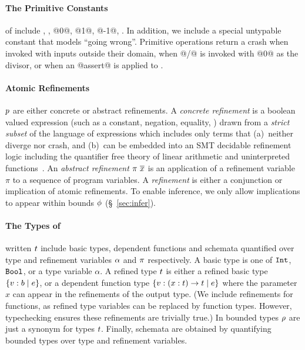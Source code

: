 \paragraph{The Primitive Constants} of \corelan include
\true, \false, @0@, @1@, @-1@, \etc. In addition, we include a
special untypable constant \ecrash that models ``going wrong''.
Primitive operations return a crash when invoked with inputs
outside their domain, \eg when @/@ is invoked with @0@ as the
divisor, or when an @assert@ is applied to \false.

\paragraph{Atomic Refinements} $p$ are either concrete or abstract refinements.
%
A \emph{concrete refinement} \creft is a boolean valued expression
(such as a constant, negation, equality, \etc)
drawn from a \emph{strict subset} of the language of expressions
which includes only terms that
%
(a)~neither diverge nor crash, and
%
(b)~can be embedded into an SMT decidable refinement logic including
%
the quantifier free theory of linear arithmetic and uninterpreted
functions~\cite{LiquidICFP14}.
%
An \emph{abstract refinement} ${\pi \ \overline{x}}$ is an application of
a refinement variable $\pi$ to a sequence of program variables.
%
A \emph{refinement}  is either a conjunction or
implication of atomic refinements.
%
To enable inference, we only allow implications to appear within
bounds $\phi$ (\S~\ref{sec:infer}).


\paragraph{The Types of} \corelan written $t$ include basic types,
dependent functions and schemata quantified over type and refinement
variables $\alpha$ and $\pi$ respectively.
%
A basic type is one of $\texttt{Int}$, $\texttt{Bool}$, or a type
variable $\alpha$.
%
A refined type $t$ is either a refined basic type $\left\lbrace v : b\mid e\right\rbrace$,
or a dependent function type $\left\lbrace v : {(x:t)} \rightarrow t\mid e\right\rbrace$ where
the parameter $x$ can appear in the refinements of the output type.
%
(We include refinements for functions, as refined type variables can be
replaced by function types. However, typechecking ensures these refinements
are trivially true.)
%
In \corelan bounded types $\rho$ are just a synonym for types $t$.
%
Finally, schemata are obtained by quantifying bounded types over type
and refinement variables.

